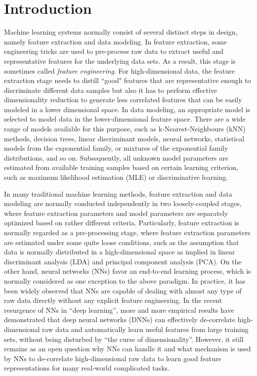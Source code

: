 \documentclass[11pt]{article}
\begin{document}
\section{Introduction}
\label{sec_intro}

Machine learning systems normally consist of several distinct steps in design, namely feature extraction and data modeling. In feature extraction, some engineering tricks are used to pre-process raw data to extract useful and representative features for the underlying data sets. As a result, this stage is sometimes called {\em feature engineering}. For high-dimensional data, the feature extraction stage needs to distill ``good" features that are representative enough to discriminate different data samples but also it has to perform effective dimensionality reduction to generate less correlated features that can be easily modeled in a lower dimensional space. In data modeling, an appropriate model is selected to model data in the lower-dimensional feature space. There are a wide range of models available for this purpose, such as k-Nearest-Neighbours (kNN) methods, decision trees, linear discriminant models, neural networks, statistical models from the exponential family, or mixtures of the exponential family distributions, and so on. Subsequently, all unknown model parameters are estimated from available training samples based on certain learning criterion, such as maximum likelihood estimation (MLE) or discriminative learning. 

In many traditional machine learning  methods, feature extraction and data modeling are normally conducted independently in two loosely-coupled stages, where feature extraction parameters and model parameters are separately optimized based on rather different criteria. Particularly, feature extraction is normally regarded as a pre-processing stage, where feature extraction parameters are estimated under some quite loose conditions, such as the assumption that data is normally distributed in a high-dimensional space as implied in linear discriminant analysis (LDA) and principal component analysis (PCA). On the other hand, neural networks (NNs) favor an end-to-end learning process, which is normally considered as one exception to the above paradigm. In practice, it has been widely observed that NNs are capable of dealing with almost any type of raw data directly without any explicit feature engineering. In the recent  resurgence of NNs in ``deep learning'', more and more empirical results have demonstrated that deep neural networks (DNNs) can effectively de-correlate high-dimensional raw data and automatically learn useful features from large training sets, without being disturbed by ``the curse of dimensionality''.
However, it still remains as an open question why NNs can handle it and what mechanism is used by NNs to de-correlate high-dimensional raw data to learn good feature representations for many real-world complicated tasks.  
\end{document}
